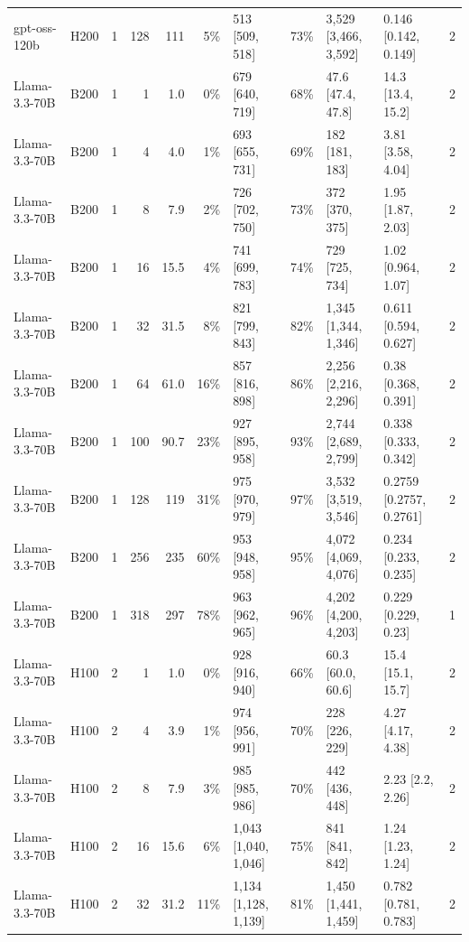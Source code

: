 \begin{landscape}
\begin{longtable}{llrrrrlrllr}
gpt-oss-120b & H200 & 1 & 128 & 111 & 5\% & 513 {[}509, 518{]} & 73\% & 3,529 {[}3,466, 3,592{]} & 0.146 {[}0.142, 0.149{]} & 2 \\
Llama-3.3-70B & B200 & 1 & 1 & 1.0 & 0\% & 679 {[}640, 719{]} & 68\% & 47.6 {[}47.4, 47.8{]} & 14.3 {[}13.4, 15.2{]} & 2 \\
Llama-3.3-70B & B200 & 1 & 4 & 4.0 & 1\% & 693 {[}655, 731{]} & 69\% & 182 {[}181, 183{]} & 3.81 {[}3.58, 4.04{]} & 2 \\
Llama-3.3-70B & B200 & 1 & 8 & 7.9 & 2\% & 726 {[}702, 750{]} & 73\% & 372 {[}370, 375{]} & 1.95 {[}1.87, 2.03{]} & 2 \\
Llama-3.3-70B & B200 & 1 & 16 & 15.5 & 4\% & 741 {[}699, 783{]} & 74\% & 729 {[}725, 734{]} & 1.02 {[}0.964, 1.07{]} & 2 \\
Llama-3.3-70B & B200 & 1 & 32 & 31.5 & 8\% & 821 {[}799, 843{]} & 82\% & 1,345 {[}1,344, 1,346{]} & 0.611 {[}0.594, 0.627{]} & 2 \\
Llama-3.3-70B & B200 & 1 & 64 & 61.0 & 16\% & 857 {[}816, 898{]} & 86\% & 2,256 {[}2,216, 2,296{]} & 0.38 {[}0.368, 0.391{]} & 2 \\
Llama-3.3-70B & B200 & 1 & 100 & 90.7 & 23\% & 927 {[}895, 958{]} & 93\% & 2,744 {[}2,689, 2,799{]} & 0.338 {[}0.333, 0.342{]} & 2 \\
Llama-3.3-70B & B200 & 1 & 128 & 119 & 31\% & 975 {[}970, 979{]} & 97\% & 3,532 {[}3,519, 3,546{]} & 0.2759 {[}0.2757, 0.2761{]} & 2 \\
Llama-3.3-70B & B200 & 1 & 256 & 235 & 60\% & 953 {[}948, 958{]} & 95\% & 4,072 {[}4,069, 4,076{]} & 0.234 {[}0.233, 0.235{]} & 2 \\
Llama-3.3-70B & B200 & 1 & 318 & 297 & 78\% & 963 {[}962, 965{]} & 96\% & 4,202 {[}4,200, 4,203{]} & 0.229 {[}0.229, 0.23{]} & 1 \\
Llama-3.3-70B & H100 & 2 & 1 & 1.0 & 0\% & 928 {[}916, 940{]} & 66\% & 60.3 {[}60.0, 60.6{]} & 15.4 {[}15.1, 15.7{]} & 2 \\
Llama-3.3-70B & H100 & 2 & 4 & 3.9 & 1\% & 974 {[}956, 991{]} & 70\% & 228 {[}226, 229{]} & 4.27 {[}4.17, 4.38{]} & 2 \\
Llama-3.3-70B & H100 & 2 & 8 & 7.9 & 3\% & 985 {[}985, 986{]} & 70\% & 442 {[}436, 448{]} & 2.23 {[}2.2, 2.26{]} & 2 \\
Llama-3.3-70B & H100 & 2 & 16 & 15.6 & 6\% & 1,043 {[}1,040, 1,046{]} & 75\% & 841 {[}841, 842{]} & 1.24 {[}1.23, 1.24{]} & 2 \\
Llama-3.3-70B & H100 & 2 & 32 & 31.2 & 11\% & 1,134 {[}1,128, 1,139{]} & 81\% & 1,450 {[}1,441, 1,459{]} & 0.782 {[}0.781, 0.783{]} & 2 \\

\end{longtable}
\end{landscape}
